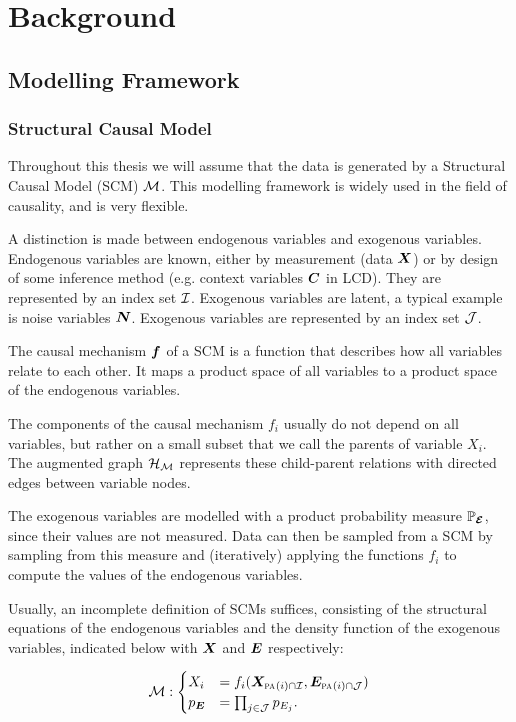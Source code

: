 \newpage
\section{Background}

\subsection{Modelling Framework}

\subsubsection{Structural Causal Model}
Throughout this thesis we will assume that the data is generated by a Structural Causal Model (SCM) $\mathcal{M}$. This modelling framework is widely used in the field of causality, and is very flexible. 

A distinction is made between endogenous variables and exogenous variables. Endogenous variables are known, either by measurement (data $\bm{X}$) or by design of some inference method (e.g. context variables $\bm{C}$ in LCD). They are represented by an index set $\mathcal{I}$. Exogenous variables are latent, a typical example is noise variables $\bm{N}$. Exogenous variables are represented by an index set $\mathcal{J}$.

The causal mechanism $\bm{f}$ of a SCM is a function that describes how all variables relate to each other. It maps a product space of all variables to a product space of the endogenous variables. 

The components of the causal mechanism $f_i$ usually do not depend on all variables, but rather on a small subset that we call the parents of variable $X_i$. The augmented graph $\mathcal{H}_{\mathcal{M}}$ represents these child-parent relations with directed edges between variable nodes.

The exogenous variables are modelled with a product probability measure $\mathbb{P}_{\bm{\mathcal{E}}}$, since their values are not measured. Data can then be sampled from a SCM by sampling from this measure and (iteratively) applying the functions $f_i$ to compute the values of the endogenous variables.

Usually, an incomplete definition of SCMs suffices, consisting of the structural equations of the endogenous variables and the density function of the exogenous variables, indicated below with $\bm{X}$ and $\bm{E}$ respectively:

$$\mathcal{M}: \begin{cases}
    X_i &= f_i(\bm{X}_{\text{\normalfont\scshape pa}_{}(i) \cap \mathcal{I}}, \bm{E}_{\text{\normalfont\scshape pa}_{}(i) \cap \mathcal{J}}) \\
    p_{\bm{E}} & = \prod_{j\in\mathcal{J}} p_{E_j}.
\end{cases}$$

